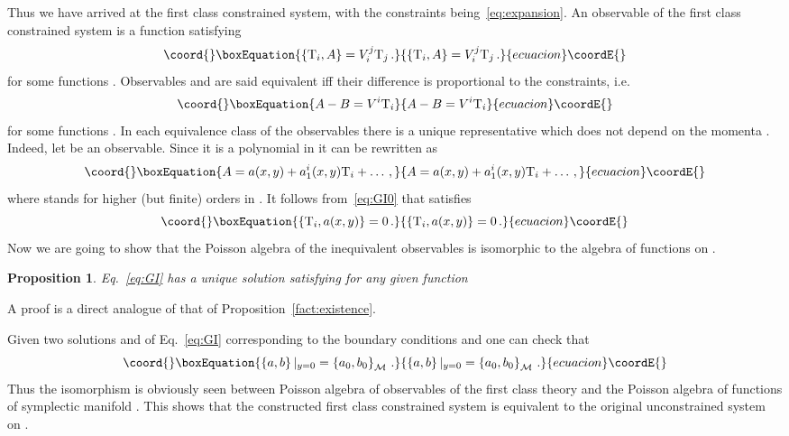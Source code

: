 \documentclass[a4paper,11pt,oneside]{amsart}
\theoremstyle{plain}
\numberwithin{equation}{section} %
\numberwithin{figure}{section} %
\newtheorem{fact}{Proposition}[section]
\providecommand{\pb}[2]{\left\{{}#1{},{}#2{}\right\}}
\providecommand{\func}[1]{{{\mathcal C}^\infty}{(#1)}}             %
\def\cT{{\rm T}}
\def\manM{{\mathcal M}}
\begin{document}
\noindent
Thus we have arrived at the first class constrained system,
with the constraints being~\eqref{eq:expansion}.  An
observable of the first class constrained system
is a function \coordHE{} satisfying
\begin{equation}\coord{}\boxEquation{
\label{eq:GI0}
\pb{\cT_i}{A}=V_i^j\cT_j\,.
}{
\pb{\cT_i}{A}=V_i^j\cT_j\,.
}{ecuacion}\coordE{}\end{equation}
for some functions \coordHE{}.  Observables \coordHE{} and
\coordHE{} are said equivalent iff
their difference is proportional to the constraints, i.e.
\begin{equation}\coord{}\boxEquation{
A-B=V^i\cT_i
}{
A-B=V^i\cT_i
}{ecuacion}\coordE{}\end{equation}
for some functions \coordHE{}.  In each equivalence class of the
observables there is a unique representative which does not depend
on the momenta \coordHE{}.  Indeed, let \coordHE{} be an
observable.  Since it is a polynomial in \coordHE{} it can be rewritten as
\begin{equation}\coord{}\boxEquation{
A=a(x,y)+a^i_1(x,y)\cT_i+\ldots\,,
}{
A=a(x,y)+a^i_1(x,y)\cT_i+\ldots\,,
}{ecuacion}\coordE{}\end{equation}
where \myHighlight{$\ldots$}\coordHE{} stands for higher (but finite) orders in
\myHighlight{$\cT$}\coordHE{}.  It follows from~\eqref{eq:GI0} that \coordHE{} satisfies
\begin{equation}\coord{}\boxEquation{
\label{eq:GI} \pb{\cT_i}{a(x,y)}=0\,.
}{
\pb{\cT_i}{a(x,y)}=0\,.
}{ecuacion}\coordE{}\end{equation}
Now we are going to show that the
Poisson algebra of the inequivalent observables is isomorphic
to the algebra of functions on \myHighlight{$\manM$}\coordHE{}.
\begin{fact}
\label{fact:extention}
Eq.~\eqref{eq:GI} has a unique solution \coordHE{} satisfying
\coordHE{} for any given function \myHighlight{$a_0 \in \func\manM$}\coordHE{}
\end{fact}
\noindent
A proof is a direct analogue of that of
Proposition~\eqref{fact:existence}.

\noindent
Given two solutions \coordHE{} and
\coordHE{} of Eq.~\eqref{eq:GI} corresponding to the
boundary conditions \coordHE{} and \coordHE{} one
can check that
\begin{equation}\coord{}\boxEquation{
         \pb{a}{b}|_{y=0}=\pb{a_0}{b_0}_{\manM}\,.
}{
         \pb{a}{b}|_{y=0}=\pb{a_0}{b_0}_{\manM}\,.
}{ecuacion}\coordE{}\end{equation}
Thus the isomorphism is obviously seen between Poisson algebra
of observables of the first class theory and the Poisson algebra
of functions of symplectic manifold \myHighlight{$\manM$}\coordHE{}.  This
shows that the constructed first class constrained
system is equivalent to the original unconstrained
system on \myHighlight{$\manM$}\coordHE{}.
\end{document}
